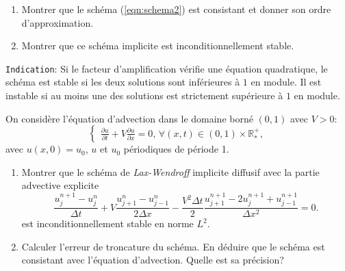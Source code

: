 \documentclass[12pt,a4paper]{article}
\begin{document}
\begin{enumerate}
\item Montrer que le schéma (\ref{eqn:schema2}) est consistant et donner son ordre d'approximation.
\item Montrer que ce sch\'ema implicite est inconditionnellement stable. 
\end{enumerate}
\texttt{Indication}: Si le facteur d'amplification vérifie une équation quadratique, le schéma est stable si les deux solutions sont inférieures à $1$ en module. Il est instable si au moins une des solutions est strictement supérieure à $1$ en module.\\


\noindent On considère l'\'equation d'advection dans le domaine born\'e $(0,1)$ avec $V>0$:
$$
\begin{cases}
\displaystyle\frac{\partial u}{\partial t}+V\frac{\partial u}{\partial
  x}=0,\, \forall (x,t)\in(0,1)\times\mathbb{R}^+_*,
\end{cases}
$$
avec $u(x, 0) = u_0$, $u$ et $u_0$ p\'eriodiques de p\'eriode 1. \\

\begin{enumerate}
\item Montrer que le sch\'ema de {\it Lax-Wendroff} implicite diffusif avec la partie advective explicite
$$
\frac{u_j^{n+1}-u_{j}^{n}}{\Delta t}+V
\frac{u_{j+1}^{n}-u_{j-1}^{n}}{2\Delta x}-\frac{V^2\Delta t}{2}\frac{u_{j+1}^{n+1}-2u_j^{n+1}+u_{j-1}^{n+1}}{\Delta x^2}=0.
$$
est inconditionnellement stable en norme $L^2$. \\

\item Calculer l'erreur de troncature du sch\'ema.
En d\'eduire que le sch\'ema est consistant avec l'\'equation d'advection. Quelle est sa précision? 

%
%
\end{enumerate}
\end{document}
